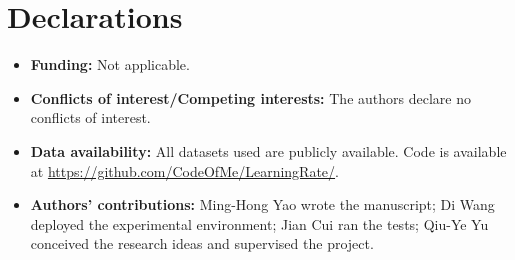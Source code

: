 \documentclass[a4paper,fleqn]{cas-dc}
\begin{document}
\section*{Declarations}

\begin{itemize}
\item \textbf{Funding:} Not applicable.
\item \textbf{Conflicts of interest/Competing interests:} The authors declare no conflicts of interest.
\item \textbf{Data availability:} All datasets used are publicly available. Code is available at \url{https://github.com/CodeOfMe/LearningRate/}.
\item \textbf{Authors' contributions:} Ming-Hong Yao wrote the manuscript; Di Wang deployed the experimental environment; Jian Cui ran the tests; Qiu-Ye Yu conceived the research ideas and supervised the project.
\end{itemize}

\printcredits



\end{document}
